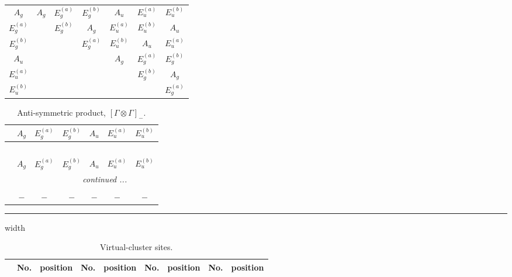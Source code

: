\documentclass[fleqn,10pt,landscape]{article}
\begin{document}
\begin{itemize}
\begin{center}
\begin{longtable}{c|cccccc}
$ A_{g} $ & $ A_{g} $ & $ E_{g}^{(a)} $ & $ E_{g}^{(b)} $ & $ A_{u} $ & $ E_{u}^{(a)} $ & $ E_{u}^{(b)} $ \\
$ E_{g}^{(a)} $ & $  $ & $ E_{g}^{(b)} $ & $ A_{g} $ & $ E_{u}^{(a)} $ & $ E_{u}^{(b)} $ & $ A_{u} $ \\
$ E_{g}^{(b)} $ & $  $ & $  $ & $ E_{g}^{(a)} $ & $ E_{u}^{(b)} $ & $ A_{u} $ & $ E_{u}^{(a)} $ \\
$ A_{u} $ & $  $ & $  $ & $  $ & $ A_{g} $ & $ E_{g}^{(a)} $ & $ E_{g}^{(b)} $ \\
$ E_{u}^{(a)} $ & $  $ & $  $ & $  $ & $  $ & $ E_{g}^{(b)} $ & $ A_{g} $ \\
$ E_{u}^{(b)} $ & $  $ & $  $ & $  $ & $  $ & $  $ & $ E_{g}^{(a)} $ \\
\end{longtable}
\end{center}
\begin{center}
\renewcommand{\arraystretch}{1.0}
\begin{longtable}{ccccccc}
\caption{Anti-symmetric product, $[\Gamma\otimes\Gamma]_-$.}
 \\
 \hline \hline
 & $ A_{g} $ & $ E_{g}^{(a)} $ & $ E_{g}^{(b)} $ & $ A_{u} $ & $ E_{u}^{(a)} $ & $ E_{u}^{(b)} $ \\ \hline \endfirsthead

\multicolumn{6}{l}{\tablename\ \thetable{}} \\
 \hline \hline
 & $ A_{g} $ & $ E_{g}^{(a)} $ & $ E_{g}^{(b)} $ & $ A_{u} $ & $ E_{u}^{(a)} $ & $ E_{u}^{(b)} $ \\ \hline \endhead

 \hline \hline
\multicolumn{6}{r}{\footnotesize\it continued ...} \\ \endfoot

 \hline \hline
\multicolumn{6}{r}{} \\ \endlastfoot

$  $ & $ - $ & $ - $ & $ - $ & $ - $ & $ - $ & $ - $ \\
\end{longtable}
\end{center}

 \hfil \hrule height 1mm width \textwidth \hfil

{
\scriptsize
\begin{center}
\renewcommand{\arraystretch}{1.7}
\begin{longtable}{ccccccccc}
\caption{Virtual-cluster sites.}
 \\
 \hline \hline
 & No. & position & No. & position & No. & position & No. & position \\ \hline \endfirsthead


\end{longtable}
\end{center}}
\end{itemize}
\end{document}
